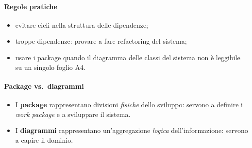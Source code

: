 \documentclass[a4paper,12pt]{article}
\begin{document}
\paragraph{Regole pratiche}
\begin{itemize}
  \item evitare cicli nella struttura delle dipendenze;
  \item troppe dipendenze: provare a fare refactoring del sistema;
  \item usare i package quando il diagramma delle classi del sistema non è leggibile su
        un singolo foglio A4.
\end{itemize}

\paragraph{Package vs.\ diagrammi}
\begin{itemize}
  \item I \textbf{package} rappresentano divisioni \emph{fisiche} dello sviluppo: servono
        a definire i \emph{work package} e a sviluppare il sistema.
  \item I \textbf{diagrammi} rappresentano un'aggregazione \emph{logica}
        dell'informazione: servono a capire il dominio.
\end{itemize}
\end{document}
